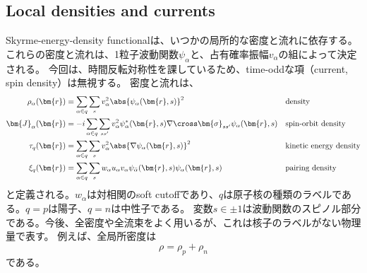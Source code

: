 \documentclass[a4paper,11pt,uplatex]{jsarticle}%
\begin{document}
\subsection{Local densities and currents}
Skyrme-energy-density functionalは、いつかの局所的な密度と流れに依存する。これらの密度と流れは、1粒子波動関数$\psi_\alpha$と、占有確率振幅$v_\alpha$の組によって決定される。
今回は、時間反転対称性を課しているため、time-oddな項（current, spin density）は無視する。
密度と流れは、
\begin{align}
  \rho_\alpha(\bm{r})   & =\sum_{\alpha\in q}\sum_{s}v_\alpha^2\abs{\psi_\alpha(\bm{r},s)}^2                                                  &  & \text{density}                \\
  \bm{J}_\alpha(\bm{r}) & =-i\sum_{\alpha\in q}\sum_{ss'}v_\alpha^2\psi^*_\alpha(\bm{r},s)\nabla\cross \bm{\sigma}_{ss'}\psi_\alpha(\bm{r},s) &  & \text{spin-orbit density}     \\
  \tau_q(\bm{r})        & = \sum_{\alpha\in q}\sum_{s}v_\alpha^2\abs{\nabla\psi_\alpha(\bm{r},s)}^2                                           &  & \text{kinetic energy density} \\
  \xi_q(\bm{r})         & = \sum_{\alpha\in q}\sum_{s}w_\alpha u_\alpha v_\alpha \psi_{\bar{\alpha}}(\bm{r},s)\psi_\alpha(\bm{r},s)           &  & \text{pairing density}
\end{align}
と定義される。$w_\alpha$は対相関のsoft cutoffであり、$q$は原子核の種類のラベルである。$q=p$は陽子、$q=n$は中性子である。
変数$s\in \pm 1$は波動関数のスピノル部分である。今後、全密度や全流束をよく用いるが、これは核子のラベルがない物理量で表す。
例えば、全局所密度は
\begin{equation}
  \rho = \rho_p + \rho_n
\end{equation}
である。
\end{document}

